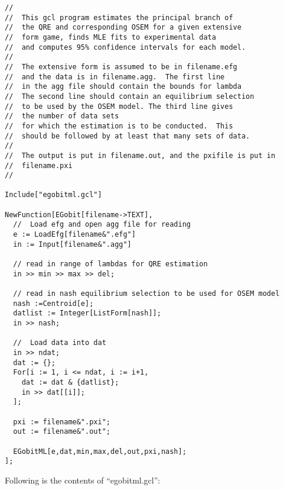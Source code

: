 {\scriptsize
\begin{verbatim}
//
//  This gcl program estimates the principal branch of
//  the QRE and corresponding OSEM for a given extensive 
//  form game, finds MLE fits to experimental data 
//  and computes 95% confidence intervals for each model. 
//
//  The extensive form is assumed to be in filename.efg
//  and the data is in filename.agg.  The first line
//  in the agg file should contain the bounds for lambda 
//  The second line should contain an equilibrium selection 
//  to be used by the OSEM model. The third line gives 
//  the number of data sets
//  for which the estimation is to be conducted.  This 
//  should be followed by at least that many sets of data.
//
//  The output is put in filename.out, and the pxifile is put in
//  filename.pxi
//

Include["egobitml.gcl"]

NewFunction[EGobit[filename->TEXT],
  //  Load efg and open agg file for reading
  e := LoadEfg[filename&".efg"]
  in := Input[filename&".agg"]

  // read in range of lambdas for QRE estimation
  in >> min >> max >> del;

  // read in nash equilibrium selection to be used for OSEM model
  nash :=Centroid[e];
  datlist := Integer[ListForm[nash]];
  in >> nash;

  //  Load data into dat
  in >> ndat;
  dat := {};
  For[i := 1, i <= ndat, i := i+1,
    dat := dat & {datlist};
    in >> dat[[i]];
  ];

  pxi := filename&".pxi";
  out := filename&".out";

  EGobitML[e,dat,min,max,del,out,pxi,nash];
];
\end{verbatim}
}

\noindent
Following is the contents of ``egobitml.gcl'':

